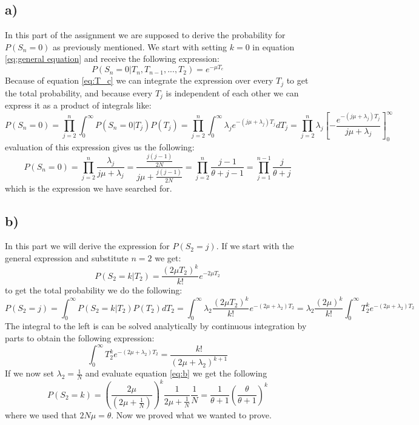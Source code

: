 \documentclass[15pt]{article}
\begin{document}
\subsection{a)}
In this part of the assignment we are supposed to derive the probability for $P(S_n = 0)$ as previously mentioned. We start with setting $k = 0$ in equation \ref{eq:general equation} and receive the following expression:
\begin{equation}
	P(S_n = 0 |T_n, T_{n-1},..., T_2) = e^{-\mu T_c}
\end{equation}
Because of equation \ref{eq:T_c} we can integrate the expression over every $T_j$ to get the total probability, and because every $T_j$ is independent of each other we can express it as a product of integrals like:
\begin{equation}
	P(S_n = 0 )= \prod_{j=2}^n\int_0^\infty P(S_n=0|T_j)P(T_j)=\prod_{j=2}^n \int_0^\infty \lambda_j e^{-(j\mu +\lambda_j)T_j}dT_j = \prod_{j=2}^n\lambda_j\left[-\frac{e^{-(j\mu + \lambda_j)T_j}}{j\mu + \lambda_j} \right]^\infty_0
	\label{eq:}
\end{equation}
evaluation of this expression gives us the following:
\begin{equation}
	P(S_n = 0)= \prod_{j=2}^{n}\frac{\lambda_j}{j\mu + \lambda_j} = \frac{\frac{j(j-1)}{2N}}{j\mu + \frac{j(j-1)}{2N}} = \prod_{j=2}^n\frac{j-1}{\theta + j-1} = \prod_{j=1}^{n-1} \frac{j}{\theta + j}
\end{equation}
which is the expression we have searched for.

\subsection{b)}
In this part we will derive the expression for $P(S_2 = j)$. If we start with the general expression and substitute $n=2$ we get:
\begin{equation}
	P(S_2 = k| T_2)= \frac{(2\mu T_2)^k}{k!}e^{-2\mu T_2}
\end{equation}
to get the total probability we do the following:
\begin{equation}
	P(S_2 = j)= \int_0^\infty P(S_2 = k|T_2)P(T_2)dT_2 = \int_0^\infty \lambda_2\frac{(2\mu T_2)^k}{k!}e^{-(2\mu + \lambda_2) T_2} = \lambda_2\frac{(2\mu)^k}{k!}\int_0^\infty T_2^ke^{-(2\mu+ \lambda_2)T_2}
	\label{eq:b}
\end{equation}
The integral to the left is can be solved analytically by continuous integration by parts to obtain the following expression:
\begin{equation}
	\int_0^\infty T_2^ke^{-(2\mu +\lambda_2)T_2} = \frac{k!}{(2\mu +\lambda_2)^{k+1}}
\end{equation}
If we now set $\lambda_2 = \frac{1}{N}$ and evaluate equation \ref{eq:b} we get the following
\begin{equation}
	P(S_2 = k) = \left(\frac{2\mu}{(2\mu + \frac{1}{N})}\right)^k\frac{1}{2\mu + \frac{1}{N}}\frac{1}{N} = \frac{1}{\theta + 1}\left( \frac{\theta}{\theta + 1}\right)^k
\end{equation}
where we used that $2N\mu = \theta$. Now we proved what we wanted to prove.
\end{document}
